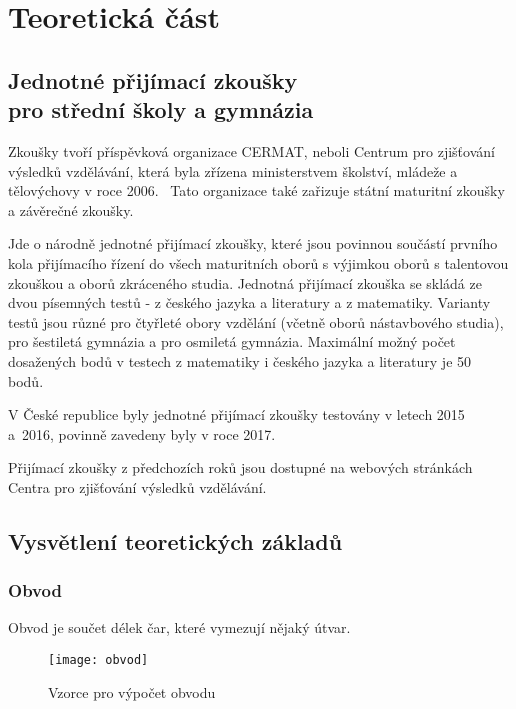 \chapter{Teoretická část}


\section[Jednotné přijímací zkoušky pro střední školy a gymnázia]{Jednotné přijímací zkoušky\\pro střední školy a gymnázia}

Zkoušky tvoří příspěvková organizace CERMAT, neboli Centrum pro zjišťování výsledků vzdělávání, která byla zřízena ministerstvem školství, mládeže a tělovýchovy v roce 2006.~\cite{zakon_CERMAT} Tato organizace také zařizuje státní maturitní zkoušky a závěrečné zkoušky.~\cite{CERMAT_p_m}



Jde o národně jednotné přijímací zkoušky, které jsou povinnou součástí prvního kola přijímacího řízení do všech maturitních oborů s výjimkou oborů s talentovou zkouškou a oborů zkráceného studia.
Jednotná přijímací zkouška se skládá ze dvou písemných testů - z českého jazyka a literatury a z matematiky.
Varianty testů jsou různé pro čtyřleté obory vzdělání (včetně oborů nástavbového studia), pro šestiletá gymnázia a pro osmiletá gymnázia.
Maximální možný počet dosažených bodů v testech z matematiky i českého jazyka a literatury je 50 bodů.~\cite{CERMAT_co_to_je}

V České republice byly jednotné přijímací zkoušky testovány v letech 2015 a~2016, povinně zavedeny byly v roce 2017.~\cite{CERMAT_rocni_zprava}

Přijímací zkoušky z předchozích roků jsou dostupné na webových stránkách Centra pro zjišťování výsledků vzdělávání.~\cite{CERMAT_pdfka}


\section{Vysvětlení teoretických základů}

\subsection{Obvod}
Obvod je součet délek čar, které vymezují nějaký útvar.~\cite{umim_mat}

\begin{figure}[p]
    \caption{Vzorce pro výpočet obvodu~\cite{umim_mat}}
    \centering
    \texttt{[image: obvod]}
\end{figure}

